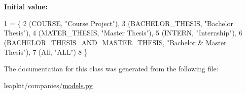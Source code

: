 {\bfseries Initial value\-:}
\begin{DoxyCode}
1 = \{
2         (COURSE, \textcolor{stringliteral}{"Course Project"}),
3         (BACHELOR\_THESIS, \textcolor{stringliteral}{"Bachelor Thesis"}),
4         (MATER\_THESIS, \textcolor{stringliteral}{"Master Thesis"}),
5         (INTERN, \textcolor{stringliteral}{"Internship"}),
6         (BACHELOR\_THESIS\_AND\_MASTER\_THESIS, \textcolor{stringliteral}{"Bachelor & Master Thesis"}),
7         (All, \textcolor{stringliteral}{"ALL"})
8     \}
\end{DoxyCode}


The documentation for this class was generated from the following file\-:\begin{DoxyCompactItemize}
\item 
leapkit/companies/\hyperlink{companies_2models_8py}{models.\-py}\end{DoxyCompactItemize}
